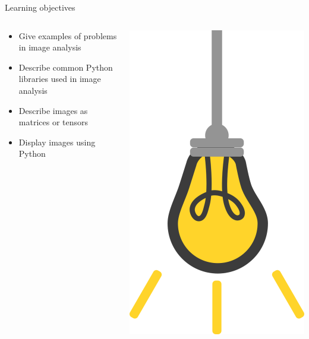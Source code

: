 \documentclass[9pt, aspectratio=169]{beamer}
\begin{document}
\begin{frame}
    {Learning objectives}
    \begin{columns}
        \begin{column}{0.8\textwidth}
            \begin{itemize}
                \item Give examples of problems in image analysis
                \item Describe common Python libraries used in image analysis
                \item Describe images as matrices or tensors
                \item Display images using Python
            \end{itemize}
        \end{column}
        \begin{column}{0.2\textwidth}
            \includegraphics[angle=-30, origin=tr, width=1.5\textwidth]{lightbulb.png}
        \end{column}
    \end{columns}
\end{frame}
\end{document}
